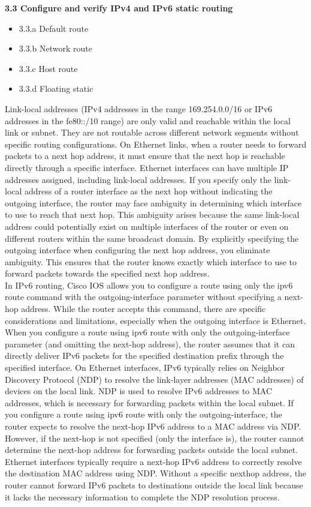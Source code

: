 \documentclass{article}
\begin{document}
\textbf{3.3 Configure and verify IPv4 and IPv6 static routing}
\begin{itemize}
\item 3.3.a Default route
\item 3.3.b Network route
\item 3.3.c Host route
\item 3.3.d Floating static
\end{itemize}
	
	Link-local addresses (IPv4 addresses in the range 169.254.0.0/16 or IPv6 addresses in the fe80::/10 range) are only valid and reachable within the local link or subnet. They are not routable across different network segments without specific routing configurations. On Ethernet links, when a router needs to forward packets to a next hop address, it must ensure that the next hop is reachable directly through a specific interface. Ethernet interfaces can have multiple IP addresses assigned, including link-local addresses. If you specify only the link-local address of a router interface as the next hop without indicating the outgoing interface, the router may face ambiguity in determining which interface to use to reach that next hop. This ambiguity arises because the same link-local address could potentially exist on multiple interfaces of the router or even on different routers within the same broadcast domain. By explicitly specifying the outgoing interface when configuring the next hop address, you eliminate ambiguity. This ensures that the router knows exactly which interface to use to forward packets towards the specified next hop address.\\
	
	In IPv6 routing, Cisco IOS allows you to configure a route using only the ipv6 route command with the outgoing-interface parameter without specifying a next-hop address. While the router accepts this command, there are specific considerations and limitations, especially when the outgoing interface is Ethernet. When you configure a route using ipv6 route with only the outgoing-interface parameter (and omitting the next-hop address), the router assumes that it can directly deliver IPv6 packets for the specified destination prefix through the specified interface. On Ethernet interfaces, IPv6 typically relies on Neighbor Discovery Protocol (NDP) to resolve the link-layer addresses (MAC addresses) of devices on the local link. NDP is used to resolve IPv6 addresses to MAC addresses, which is necessary for forwarding packets within the local subnet. If you configure a route using ipv6 route with only the outgoing-interface, the router expects to resolve the next-hop IPv6 address to a MAC address via NDP. However, if the next-hop is not specified (only the interface is), the router cannot determine the next-hop address for forwarding packets outside the local subnet. Ethernet interfaces typically require a next-hop IPv6 address to correctly resolve the destination MAC address using NDP. Without a specific next\-hop address, the router cannot forward IPv6 packets to destinations outside the local link because it lacks the necessary information to complete the NDP resolution process.\\
	
\end{document}
